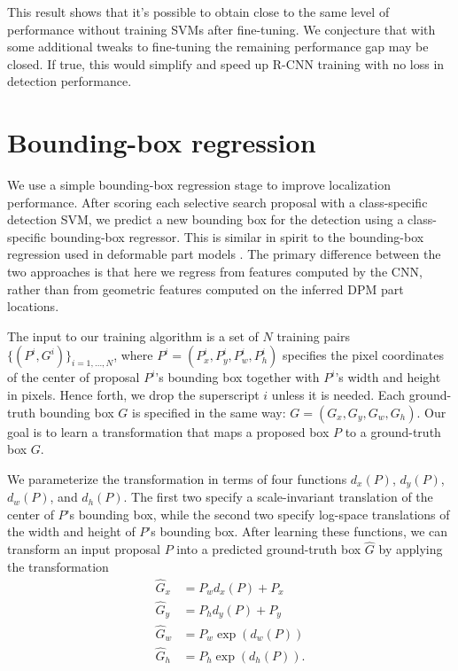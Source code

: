 This result shows that it's possible to obtain close to the same level of performance without training SVMs after fine-tuning.
We conjecture that with some additional tweaks to fine-tuning the remaining performance gap may be closed.
If true, this would simplify and speed up R-CNN training with no loss in detection performance.

\section{Bounding-box regression}
We use a simple bounding-box regression stage to improve localization performance.
After scoring each selective search proposal with a class-specific detection SVM, we predict a new bounding box for the detection using a class-specific bounding-box regressor.
This is similar in spirit to the bounding-box regression used in deformable part models \cite{lsvm-pami}.
The primary difference between the two approaches is that here we regress from features computed by the CNN, rather than from geometric features computed on the inferred DPM part locations.

The input to our training algorithm is a set of $N$ training pairs $\{(P^i, G^i)\}_{i = 1,\ldots,N}$, where $P^i = (P_x^i, P_y^i, P_w^i, P_h^i)$ specifies the pixel coordinates of the center of proposal $P^i$'s bounding box together with $P^i$'s  width and height in pixels.
Hence forth, we drop the superscript $i$ unless it is needed.
Each ground-truth bounding box $G$ is specified in the same way: $G = (G_x, G_y, G_w, G_h)$.
Our goal is to learn a transformation that maps a proposed box $P$ to a ground-truth box $G$.

We parameterize the transformation in terms of four functions $d_x(P)$, $d_y(P)$, $d_w(P)$, and $d_h(P)$.
The first two specify a scale-invariant translation of the center of $P$'s bounding box, while the second two specify log-space translations of the width and height of $P$'s bounding box.
After learning these functions, we can transform an input proposal $P$ into a predicted ground-truth box $\hat{G}$ by applying the transformation
\begin{align}
\hat{G}_x &= P_w d_x(P) + P_x \\
\hat{G}_y &= P_h d_y(P) + P_y \\
\hat{G}_w &= P_w \exp(d_w(P)) \\
\hat{G}_h &= P_h \exp(d_h(P)).
\end{align}

